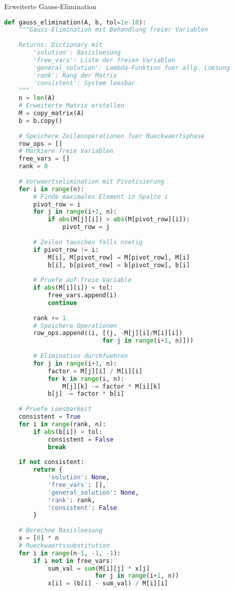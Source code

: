 \begin{examplecode}{Erweiterte Gauss-Elimination}
\begin{lstlisting}[language=Python, style=basesmol]
def gauss_elimination(A, b, tol=1e-10):
    """Gauss-Elimination mit Behandlung freier Variablen
    
    Returns: Dictionary mit
        'solution': Basisloesung
        'free_vars': Liste der freien Variablen
        'general_solution': Lambda-Funktion fuer allg. Loesung
        'rank': Rang der Matrix
        'consistent': System loesbar
    """
    n = len(A)
    # Erweiterte Matrix erstellen
    M = copy_matrix(A)
    b = b.copy()
    
    # Speichere Zeilenoperationen fuer Rueckwaertsphase
    row_ops = []
    # Markiere freie Variablen
    free_vars = []
    rank = 0
    
    # Vorwaertselimination mit Pivotisierung
    for i in range(n):
        # Finde maximales Element in Spalte i
        pivot_row = i
        for j in range(i+1, n):
            if abs(M[j][i]) > abs(M[pivot_row][i]):
                pivot_row = j
                
        # Zeilen tauschen falls noetig
        if pivot_row != i:
            M[i], M[pivot_row] = M[pivot_row], M[i]
            b[i], b[pivot_row] = b[pivot_row], b[i]
            
        # Pruefe auf freie Variable
        if abs(M[i][i]) < tol:
            free_vars.append(i)
            continue
            
        rank += 1
        # Speichere Operationen
        row_ops.append((i, [(j, -M[j][i]/M[i][i]) 
                           for j in range(i+1, n)]))
                           
        # Elimination durchfuehren
        for j in range(i+1, n):
            factor = M[j][i] / M[i][i]
            for k in range(i, n):
                M[j][k] -= factor * M[i][k]
            b[j] -= factor * b[i]
    
    # Pruefe Loesbarkeit
    consistent = True
    for i in range(rank, n):
        if abs(b[i]) > tol:
            consistent = False
            break
            
    if not consistent:
        return {
            'solution': None,
            'free_vars': [],
            'general_solution': None,
            'rank': rank,
            'consistent': False
        }
    
    # Berechne Basisloesung
    x = [0] * n
    # Rueckwaertssubstitution
    for i in range(n-1, -1, -1):
        if i not in free_vars:
            sum_val = sum(M[i][j] * x[j] 
                         for j in range(i+1, n))
            x[i] = (b[i] - sum_val) / M[i][i]
    

\end{lstlisting}
\end{examplecode}
